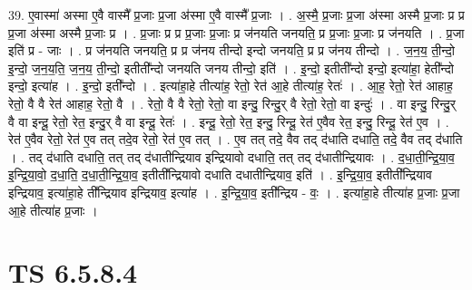 \documentclass[17pt]{extarticle}
\begin{document}
39. ए॒वास्मा॑ अस्मा ए॒वै वास्मै᳚ प्र॒जाः प्र॒जा अ॑स्मा ए॒वै वास्मै᳚ प्र॒जाः । . अ॒स्मै॒ प्र॒जाः प्र॒जा अ॑स्मा अस्मै प्र॒जाः प्र प्र प्र॒जा अ॑स्मा अस्मै प्र॒जाः प्र । . प्र॒जाः प्र प्र प्र॒जाः प्र॒जाः प्र ज॑नयति जनयति॒ प्र प्र॒जाः प्र॒जाः प्र ज॑नयति । . प्र॒जा इति॑ प्र - जाः । . प्र ज॑नयति जनयति॒ प्र प्र ज॑नय तीन्दो इन्दो जनयति॒ प्र प्र ज॑नय तीन्दो । . ज॒न॒य॒ ती॒न्दो॒ इ॒न्दो॒ ज॒न॒य॒ति॒ ज॒न॒य॒ ती॒न्दो॒ इतीती᳚न्दो जनयति जनय तीन्दो॒ इति॑ । . इ॒न्दो॒ इतीती᳚न्दो इन्दो॒ इत्या॑हा॒ हेती᳚न्दो इन्दो॒ इत्या॑ह । . इ॒न्दो॒ इती᳚न्दो । . इत्या॑हा॒हे तीत्या॑ह॒ रेतो॒ रेत॑ आ॒हे तीत्या॑ह॒ रेतः॑ । . आ॒ह॒ रेतो॒ रेत॑ आहाह॒ रेतो॒ वै वै रेत॑ आहाह॒ रेतो॒ वै । . रेतो॒ वै वै रेतो॒ रेतो॒ वा इन्दु॒ रिन्दु॒र् वै रेतो॒ रेतो॒ वा इन्दुः॑ । . वा इन्दु॒ रिन्दु॒र् वै वा इन्दू॒ रेतो॒ रेत॒ इन्दु॒र् वै वा इन्दू॒ रेतः॑ । . इन्दू॒ रेतो॒ रेत॒ इन्दु॒ रिन्दू॒ रेत॑ ए॒वैव रेत॒ इन्दु॒ रिन्दू॒ रेत॑ ए॒व । . रेत॑ ए॒वैव रेतो॒ रेत॑ ए॒व तत् तदे॒व रेतो॒ रेत॑ ए॒व तत् । . ए॒व तत् तदे॒ वैव तद् द॑धाति दधाति॒ तदे॒ वैव तद् द॑धाति । . तद् द॑धाति दधाति॒ तत् तद् द॑धातीन्द्रियाव इन्द्रियावो दधाति॒ तत् तद् द॑धातीन्द्रियावः । . द॒धा॒ती॒न्द्रि॒या॒व॒ इ॒न्द्रि॒या॒वो॒ द॒धा॒ति॒ द॒धा॒ती॒न्द्रि॒या॒व॒ इतीती᳚न्द्रियावो दधाति दधातीन्द्रियाव॒ इति॑ । . इ॒न्द्रि॒या॒व॒ इतीती᳚न्द्रियाव इन्द्रियाव॒ इत्या॑हा॒हे ती᳚न्द्रियाव इन्द्रियाव॒ इत्या॑ह । . इ॒न्द्रि॒या॒व॒ इती᳚न्द्रिय - वः॒ । . इत्या॑हा॒हे तीत्या॑ह प्र॒जाः प्र॒जा आ॒हे तीत्या॑ह प्र॒जाः । \newline
\pagebreak
{}

\section{ TS 6.5.8.4 }
\end{document}
